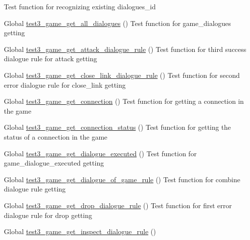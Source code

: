 \begin{DoxyRefList}
%
Test function for recognizing existing dialogues\+\_\+id  
\item[Global \mbox{\hyperlink{game__test_8c_ad0d0047e10244147bcff5d1bacf70d77}{test3\+\_\+game\+\_\+get\+\_\+all\+\_\+dialogues}} ()]\label{test__test000394}%
%
Test function for game\+\_\+dialogues getting  
\item[Global \mbox{\hyperlink{game__test_8c_ac20ba5e4e842188b80e1d7626c356b3c}{test3\+\_\+game\+\_\+get\+\_\+attack\+\_\+dialogue\+\_\+rule}} ()]\label{test__test000333}%
%
Test function for third success dialogue rule for attack getting  
\item[Global \mbox{\hyperlink{game__test_8c_a6dd195f97d76e80d781fc7550b999194}{test3\+\_\+game\+\_\+get\+\_\+close\+\_\+link\+\_\+dialogue\+\_\+rule}} ()]\label{test__test000379}%
%
Test function for second error dialogue rule for close\+\_\+link getting  
\item[Global \mbox{\hyperlink{game__test_8c_a56325225e1ea8a025ba1e9843f89ccaa}{test3\+\_\+game\+\_\+get\+\_\+connection}} ()]\label{test__test000260}%
%
Test function for getting a connection in the game  
\item[Global \mbox{\hyperlink{game__test_8c_aa4c13cc2cb5af31527f81e9e685746a3}{test3\+\_\+game\+\_\+get\+\_\+connection\+\_\+status}} ()]\label{test__test000257}%
%
Test function for getting the status of a connection in the game  
\item[Global \mbox{\hyperlink{game__test_8c_ab8f494fffca8b5200f0985941b76eaa7}{test3\+\_\+game\+\_\+get\+\_\+dialogue\+\_\+executed}} ()]\label{test__test000301}%
%
Test function for game\+\_\+dialogue\+\_\+executed getting  
\item[Global \mbox{\hyperlink{game__test_8c_a9e4f8b489018c54e02124ebd97a701e0}{test3\+\_\+game\+\_\+get\+\_\+dialogue\+\_\+of\+\_\+game\+\_\+rule}} ()]\label{test__test000389}%
%
Test function for combine dialogue rule getting  
\item[Global \mbox{\hyperlink{game__test_8c_ac8c40214539945811f99da2fbbff7409}{test3\+\_\+game\+\_\+get\+\_\+drop\+\_\+dialogue\+\_\+rule}} ()]\label{test__test000346}%
%
Test function for first error dialogue rule for drop getting  
\item[Global \mbox{\hyperlink{game__test_8c_aec593cd7829dd2b1878c1ea15382b358}{test3\+\_\+game\+\_\+get\+\_\+inspect\+\_\+dialogue\+\_\+rule}} ()]\label{test__test000353}%

\end{DoxyRefList}
